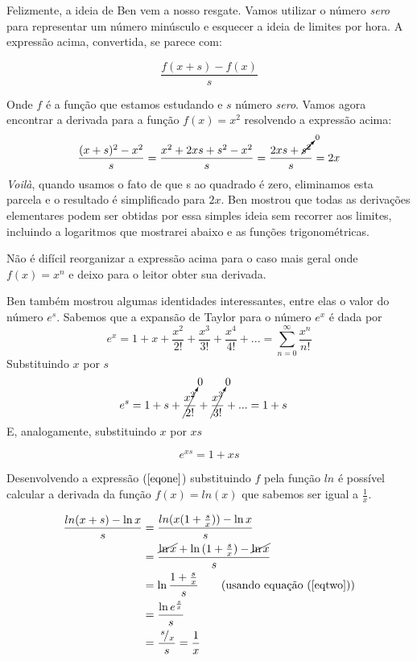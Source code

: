 \documentclass{article}
\newcommand{\slantfrac}[2]{\,^{#1}\!/_{#2}}
\begin{document}
Felizmente, a ideia de Ben vem a nosso resgate. Vamos utilizar o número \textit{sero} para representar um número minúsculo e esquecer a ideia de limites por hora. A expressão acima, convertida, se parece com:

\begin{equation} \label{eqone}
\frac{f(x+s) - f(x)}{s}
\end{equation}

Onde \(f\) é a função que estamos estudando e \(s\) número \textit{sero}.  Vamos agora encontrar a derivada para a função \(f(x)=x^2\) resolvendo a expressão acima:
\[ 
\frac{(x+s)^2-x^2}{s} = \frac{x^2 + 2xs + s^2 - x^2}{s} = \frac{2xs+\cancelto{0}{s^2}}{s} = 2x
\]
\textit{Voilà}, quando usamos o fato de que s ao quadrado é zero, eliminamos esta parcela e o resultado é simplificado para \(2x\). Ben mostrou que todas as derivações elementares podem ser obtidas por essa simples ideia sem recorrer aos limites, incluindo a logaritmos que mostrarei abaixo e as funções trigonométricas.

Não é difícil reorganizar a expressão acima para o caso mais geral onde \( f(x) = x^n\) e deixo para o leitor obter sua derivada. 

Ben também mostrou algumas identidades interessantes, entre elas o valor do número \(e^s\). Sabemos que a expansão de Taylor para o número \(e^x\) é dada por
\[
e^x = 1 + x + \frac{x^2}{2!} + \frac{x^3}{3!} + \frac{x^4}{4!} + ... = \sum_{n=0}^{\infty} \frac{x^n}{n!}
\]
Substituindo \(x\) por \(s\)
\begin{align*} 
e^s &= 1 + s + \cancelto{0}{\frac{x^2}{2!}} +\cancelto{0}{\frac{x^3}{3!}} + ... = 1+s \end{align*}
E, analogamente, substituindo \(x\) por \(xs\) 

\begin{equation} \label{eqtwo} 
 e^{xs} = 1 + xs 
\end{equation}

Desenvolvendo  a expressão \((\ref{eqone}\)) substituindo \(f\) pela função \(ln\) é possível calcular a derivada da função 
\(f(x) = ln(x)\) que sabemos ser igual a \(\frac{1}{x}\).

\begin{align*} 
\frac{ln(x+s) - \ln{x}}{s} &= \frac{ln(x(1+\frac{s}{x})) - \ln{x} }{s}  \\
&= \frac{\cancel{\ln{x}} + \ln{(1+\frac{s}{x})} - \cancel{\ln{x}}} {s} \\
&= \ln{\frac{1+ \frac{s}{x}}{s}} \tag{usando equação (\ref{eqtwo})}\\
&= \frac{\ln{e^\frac{s}{x}}}{s}  \\
&= \frac{\slantfrac{s}{x}}{s} = \frac{1}{x}
\end{align*}
\end{document}
